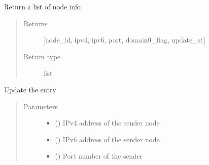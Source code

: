 \documentclass[letterpaper,10pt,english]{sphinxmanual}
\begin{document}
\begin{fulllineitems}
\begin{fulllineitems}
\label{\detokenize{bbc1.core.bbc_network:bbc1.core.bbc_network.NodeInfo.get_nodeinfo}}
Return a list of node info
\begin{quote}\begin{description}
\item[{Returns}] \leavevmode
{[}node\_id, ipv4, ipv6, port, domain0\_flag, update\_at{]}

\item[{Return type}] \leavevmode
list

\end{description}\end{quote}

\end{fulllineitems}


\begin{fulllineitems}
\label{\detokenize{bbc1.core.bbc_network:bbc1.core.bbc_network.NodeInfo.touch}}
\end{fulllineitems}


\begin{fulllineitems}
\label{\detokenize{bbc1.core.bbc_network:bbc1.core.bbc_network.NodeInfo.update}}
Update the entry
\begin{quote}\begin{description}
\item[{Parameters}] \leavevmode\begin{itemize}
\item {} 
 () \textendash{} IPv4 address of the sender node

\item {} 
 () \textendash{} IPv6 address of the sender node

\item {} 
 () \textendash{} Port number of the sender


\end{itemize}
\end{description}
\end{quote}
\end{fulllineitems}
\end{fulllineitems}
\end{document}
